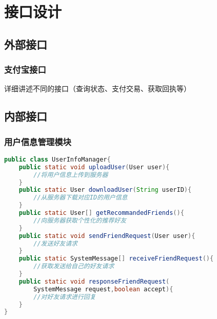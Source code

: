 \chapter{接口设计}
\section{外部接口}
\subsection{支付宝接口}
详细讲述不同的接口（查询状态、支付交易、获取回执等）

\section{内部接口}
\subsection{用户信息管理模块}
\begin{lstlisting}[language=Java, caption=用户信息管理模块接口]
public class UserInfoManager{
    public static void uploadUser(User user){
        //将用户信息上传到服务器
    }
    public static User downloadUser(String userID){
        //从服务器下载对应ID的用户信息
    }
    public static User[] getRecommandedFriends(){
        //向服务器获取个性化的推荐好友
    }
    public static void sendFriendRequest(User user){
        //发送好友请求
    }
    public static SystemMessage[] receiveFriendRequest(){
        //获取发送给自己的好友请求
    }
    public static void responseFriendRequest(
        SystemMessage request,boolean accept){
        //对好友请求进行回复
    }
}

\end{lstlisting}




